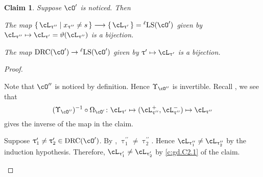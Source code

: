 \documentclass[12pt,a4paper]{amsart}
\numberwithin{equation}{section}
\newtheorem{prop}[thm]{Proposition}
\newtheorem{claim}[thm]{Claim}
\theoremstyle{remark}
\def\drc{\mathrm{DRC}}
\def\LLS{\mathrm{{}^{\ell} LS}}
\def\cOp{\cO^{\prime}}
\def\cOpp{\cO^{\prime\prime}}
\def\pcL{\cL^+}
\def\ncL{\cL^-}
\def\uptaup{\uptau^{\prime}}
\def\uptaupp{\uptau^{\prime\prime}}
\begin{document}


\begin{claim}\label{c:gd.C2}
  Suppose $\cOp$ is noticed. Then
  \begin{enumT}
    \item \label{c:gd.C2.1}The map
$\set{\cL_{\uptaupp}| x_{\uptaupp}\neq s}\longrightarrow \set{\cL_{\uptaup}}=\LLS(\cOp)$ given by
$\cL_{\uptaupp}\mapsto \cL_{\uptaup}=\vartheta(\cL_{\uptaupp})$ is a bijection.
\item
The map $\drc(\cOp)\rightarrow \LLS(\cOp)$ given by $\uptaup\mapsto \cL_{\uptaup}$ is a bijection.
\end{enumT}
\end{claim}
\begin{proof} %
  \begin{enumPF}
    \item
  Note that $\cOpp$ is noticed by definition. Hence $\Upsilon_{\cOpp}$ is invertible.
  Recall , we see that
  \[
    (\Upsilon_{\cOpp})^{-1}\circ \Omega_{\cOp}\colon
    \cL_{\uptaup}\mapsto (\pcL_{\uptaupp},\ncL_{\uptaupp})\mapsto \cL_{\uptaupp}
  \]
  gives the inverse of the map in the claim.
  \item
  Suppose $\uptaup_{1}\neq \uptaup_{2}\in \drc(\cOp)$. By ,
  $\uptaupp_{1}\neq \uptaupp_{2}$. Hence
  $\cL_{\uptaupp_{1}}\neq\cL_{\uptaupp_{2}}$ by the induction hypothesis.
  Therefore, $\cL_{\uptaup_{1}}\neq \cL_{\uptaup_{2}}$ by \ref{c:gd.C2.1}
  of the claim.
\end{enumPF}
\end{proof}
\end{document}

